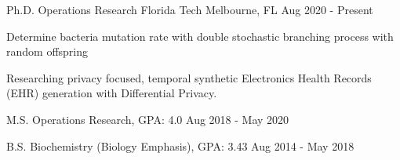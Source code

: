\vspace{-2mm}
\vspace{-2mm}

\begin{cventries}

	\cventry
	{Ph.D. Operations Research}
	{Florida Tech}
	{Melbourne, FL}
	{Aug 2020 - Present}
	{\begin{cvitems}
			\item {Determine bacteria mutation rate with double stochastic branching process with random offspring}
			\item {Researching privacy focused, temporal synthetic Electronics Health Records (EHR) generation with Differential Privacy.}
		\end{cvitems}}

	\vspace{-2mm}

	\cventry
	{M.S. Operations Research, GPA: 4.0}
	{}
	{}
	{Aug 2018 - May 2020}
	{}
	\vspace{-7mm}

	\cventry
	{B.S. Biochemistry (Biology Emphasis), GPA: 3.43}
	{}
	{}
	{Aug 2014 - May 2018}
	{}
	\vspace{-7mm}

\end{cventries}